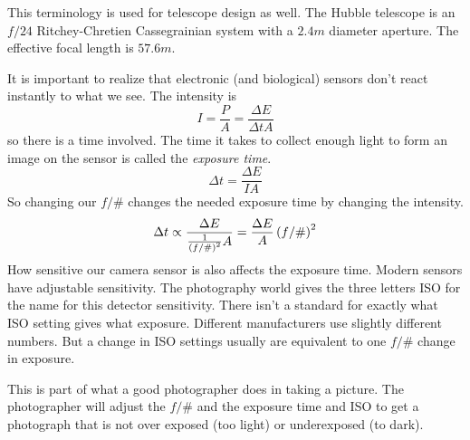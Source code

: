 \documentclass{article}
\begin{document}
This terminology is used for telescope design as well. The Hubble telescope
is an $f/24$ Ritchey-Chretien Cassegrainian system with a $2.4\unit{m}$
diameter aperture. The effective focal length is $57.6\unit{m}$.


It is important to realize that electronic (and biological) sensors don't
react instantly to what we see. The intensity is 
\[
I=\frac{P}{A}=\frac{\Delta E}{\Delta tA}
\]%
so there is a time involved. The time it takes to collect enough light to
form an image on the sensor is called the \emph{exposure time}. 
\[
\Delta t=\frac{\Delta E}{IA}
\]%
So changing our $f/\#$ changes the needed exposure time by changing the
intensity. 
\[
\Delta t\propto \frac{\Delta E}{\frac{1}{\left( f/\#\right) ^{2}}A}=\frac{%
\Delta E}{A}\left( f/\#\right) ^{2}
\]%
How sensitive our camera sensor is also affects the exposure time. Modern
sensors have adjustable sensitivity. The photography world gives the three
letters ISO for the name for this detector sensitivity. There isn't a
standard for exactly what ISO setting gives what exposure. Different
manufacturers use slightly different numbers. But a change in ISO settings
usually are equivalent to one $f/\#$ change in exposure.

This is part of what a good photographer does in taking a picture. The
photographer will adjust the $f/\#$ and the exposure time and ISO to get a
photograph that is not over exposed (too light) or underexposed (to dark).
\end{document}
